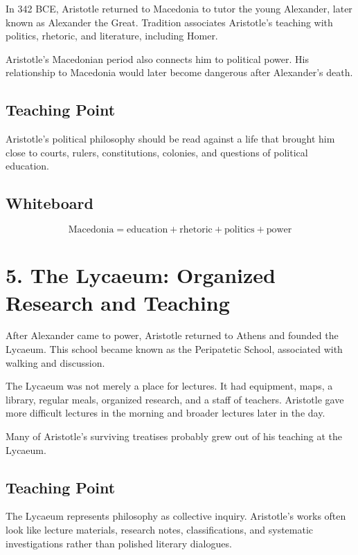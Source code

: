 \documentclass[12pt]{article}
\begin{document}
In 342 BCE, Aristotle returned to Macedonia to tutor the young Alexander, later
known as Alexander the Great. Tradition associates Aristotle's teaching with
politics, rhetoric, and literature, including Homer.

Aristotle's Macedonian period also connects him to political power. His
relationship to Macedonia would later become dangerous after Alexander's death.

\subsection*{Teaching Point}

Aristotle's political philosophy should be read against a life that brought him
close to courts, rulers, constitutions, colonies, and questions of political
education.

\subsection*{Whiteboard}

\[
\text{Macedonia} = \text{education} + \text{rhetoric} + \text{politics} + \text{power}
\]

\section*{5. The Lycaeum: Organized Research and Teaching}

After Alexander came to power, Aristotle returned to Athens and founded the
Lycaeum. This school became known as the Peripatetic School, associated with
walking and discussion.

The Lycaeum was not merely a place for lectures. It had equipment, maps, a
library, regular meals, organized research, and a staff of teachers. Aristotle
gave more difficult lectures in the morning and broader lectures later in the
day.

Many of Aristotle's surviving treatises probably grew out of his teaching at
the Lycaeum.

\subsection*{Teaching Point}

The Lycaeum represents philosophy as collective inquiry. Aristotle's works often
look like lecture materials, research notes, classifications, and systematic
investigations rather than polished literary dialogues.
\end{document}
